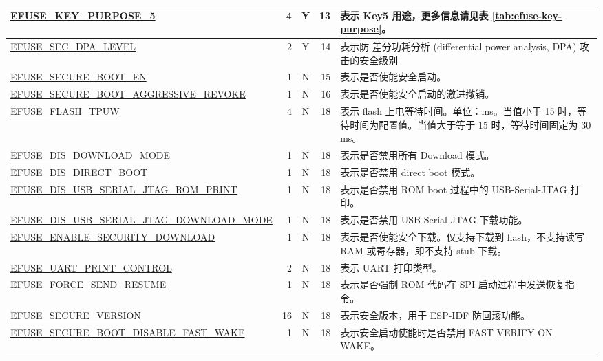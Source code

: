 \begin{longtable}[l]{ |m{8.2cm}|r|c|r|m{9.3cm}| }
    \hline
    \hyperref[fielddesc:EFUSEKEYPURPOSE5]{EFUSE\_KEY\_PURPOSE\_5} & 4 & Y & 13 & 表示 Key5 用途，更多信息请见表 \ref{tab:efuse-key-purpose}。\\
    \hline
    \hyperref[fielddesc:EFUSESECDPALEVEL]{EFUSE\_SEC\_DPA\_LEVEL} & 2 & Y & 14 & 表示防
差分功耗分析 (differential power analysis, DPA) 攻击的安全级别 \\
    \hline
    \hyperref[fielddesc:EFUSESECUREBOOTEN]{EFUSE\_SECURE\_BOOT\_EN} & 1 & N & 15 & 表示是否使能安全启动。\\
    \hline
    \hyperref[fielddesc:EFUSESECUREBOOTAGGRESSIVEREVOKE]{EFUSE\_SECURE\_BOOT\_AGGRESSIVE\_REVOKE} & 1 & N & 16 & 表示是否使能安全启动的激进撤销。\\
    \hline
    \hyperref[fielddesc:EFUSEFLASHTPUW]{EFUSE\_FLASH\_TPUW} & 4 & N & 18 & 表示 flash 上电等待时间。单位：ms。当值小于 15 时，等待时间为配置值。当值大于等于 15 时，等待时间固定为 30 ms。\\
    \hline
    \hyperref[fielddesc:EFUSEDISDOWNLOADMODE]{EFUSE\_DIS\_DOWNLOAD\_MODE} & 1 & N & 18 & 表示是否禁用所有 Download 模式。\\
    \hline
    \hyperref[fielddesc:EFUSEDISDIRECTBOOT]{EFUSE\_DIS\_DIRECT\_BOOT} & 1 & N & 18 & 表示是否禁用 direct boot 模式。\\
    \hline
    \hyperref[fielddesc:EFUSEDISUSBSERIALJTAGROMPRINT]{EFUSE\_DIS\_USB\_SERIAL\_JTAG\_ROM\_PRINT} & 1 & N & 18 & 表示是否禁用 ROM boot 过程中的 USB-Serial-JTAG 打印。\\
    \hline
    \hyperref[fielddesc:EFUSEDISUSBSERIALJTAGDOWNLOADMODE]{EFUSE\_DIS\_USB\_SERIAL\_JTAG\_DOWNLOAD\_MODE} & 1 & N & 18 & 表示是否禁用 USB-Serial-JTAG 下载功能。\\
    \hline
    \hyperref[fielddesc:EFUSEENABLESECURITYDOWNLOAD]{EFUSE\_ENABLE\_SECURITY\_DOWNLOAD} & 1 & N & 18 & 表示是否使能安全下载。仅支持下载到 flash，不支持读写 RAM 或寄存器，即不支持 stub 下载。\\
    \hline
    \hyperref[fielddesc:EFUSEUARTPRINTCONTROL]{EFUSE\_UART\_PRINT\_CONTROL} & 2 & N & 18 & 表示 UART 打印类型。\\
    \hline
    \hyperref[fielddesc:EFUSEFORCESENDRESUME]{EFUSE\_FORCE\_SEND\_RESUME} & 1 & N & 18 & 表示是否强制 ROM 代码在 SPI 启动过程中发送恢复指令。\\
    \hline
    \hyperref[fielddesc:EFUSESECUREVERSION]{EFUSE\_SECURE\_VERSION} & 16 & N & 18 & 表示安全版本，用于 ESP-IDF 防回滚功能。\\
    \hline
    \hyperref[fielddesc:EFUSESECUREBOOTDISABLEFASTWAKE]{EFUSE\_SECURE\_BOOT\_DISABLE\_FAST\_WAKE} & 1 & N & 18 & 表示安全启动使能时是否禁用 FAST VERIFY ON WAKE。\\

\end{longtable}
